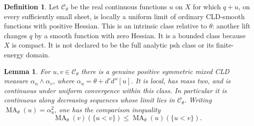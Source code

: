 \documentclass[11pt]{article}
\newtheorem{lemma}[theorem]{Lemma}
\theoremstyle{definition}\newtheorem{definition}[theorem]{Definition}
\newcommand{\dd}{d'd''}
\newcommand{\MA}{\operatorname{MA}}
\begin{document}
\begin{definition}
Let $\mathcal C_\theta$ be the real continuous functions $u$ on $X$ for which
$q+u$, on every sufficiently small sheet, is locally a uniform limit of
ordinary CLD-smooth functions with positive Hessian. This is an intrinsic
class relative to $\theta$: another lift changes $q$ by a smooth function
with zero Hessian. It is a bounded class because $X$ is compact. It is not
declared to be the full analytic psh class or its finite-energy domain.
\end{definition}

\begin{lemma}\label{boundedBT}
For $u,v\in\mathcal C_\theta$ there is a genuine positive symmetric mixed
CLD measure $\alpha_u\wedge\alpha_v$, where
$\alpha_u=\theta+\dd[u]$. It is local, has mass two, and is continuous
under uniform convergence within this class. In particular it is continuous
along decreasing sequences whose limit lies in $\mathcal C_\theta$.
Writing $\MA_\theta(u)=\alpha_u^2$, one has the comparison inequality
\[
 \MA_\theta(v)(\{u<v\})\le\MA_\theta(u)(\{u<v\}).        \tag{3.4}
\]
\end{lemma}
\end{document}
